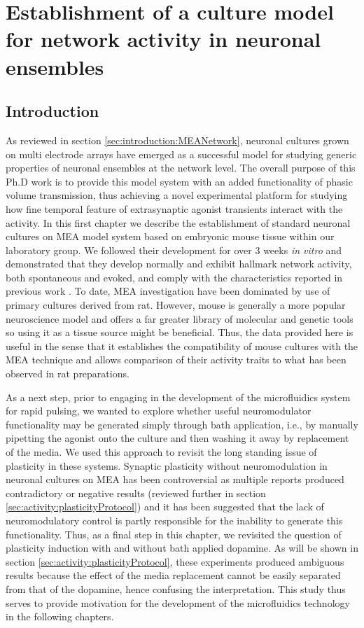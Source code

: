 \chapter{Establishment of a culture model for network activity in neuronal ensembles}
\label{chap:activity}
    \section{Introduction}
     As reviewed in section \ref{sec:introduction:MEANetwork}, neuronal cultures grown on multi electrode arrays have emerged as a successful model for studying generic properties of neuronal ensembles at the network level. The overall purpose of this Ph.D work is to provide this model system with an added functionality of phasic volume transmission, thus achieving a novel experimental platform for studying how fine temporal feature of extrasynaptic agonist transients interact with the activity. In this first chapter we describe the establishment of standard neuronal cultures on MEA model system based on embryonic mouse tissue within our laboratory group. We followed their development for over 3 weeks \textit{in vitro} and demonstrated that they develop normally and exhibit hallmark network activity, both spontaneous and evoked, and comply with the characteristics reported in previous work \cite{chiappalone2006dissociated,wagenaar2006extremely,van2004longterm,breskin2006percolation,penn2016network}. To date, MEA investigation have been dominated by use of primary cultures derived from rat. However, mouse is generally a more popular neuroscience model and offers a far greater library of molecular and genetic tools so using it as a tissue source might be beneficial. Thus, the data provided here is useful in the sense that it establishes the compatibility of mouse cultures with the MEA technique and allows comparison of their activity traits to what has been observed in rat preparations.

     As a next step, prior to engaging in the development of the microfluidics system for rapid pulsing, we wanted to explore whether useful neuromodulator functionality may be generated simply through bath application, i.e., by manually pipetting the agonist onto the culture and then washing it away by replacement of the media. We used this approach to revisit the long standing issue of plasticity in these systems. Synaptic plasticity without neuromodulation in neuronal cultures on MEA has been controversial as multiple reports produced contradictory or negative results (reviewed further in section \ref{sec:activity:plasticityProtocol}) and it has been suggested that the lack of neuromodulatory control is partly responsible for the inability to generate this functionality. Thus, as a final step in this chapter, we revisited the question of plasticity induction with and without bath applied dopamine. As will be shown in section \ref{sec:activity:plasticityProtocol}, these experiments produced ambiguous results because the effect of the media replacement cannot be easily separated from that of the dopamine, hence confusing the interpretation. This study thus serves to provide motivation for the development of the microfluidics technology in the following chapters.

